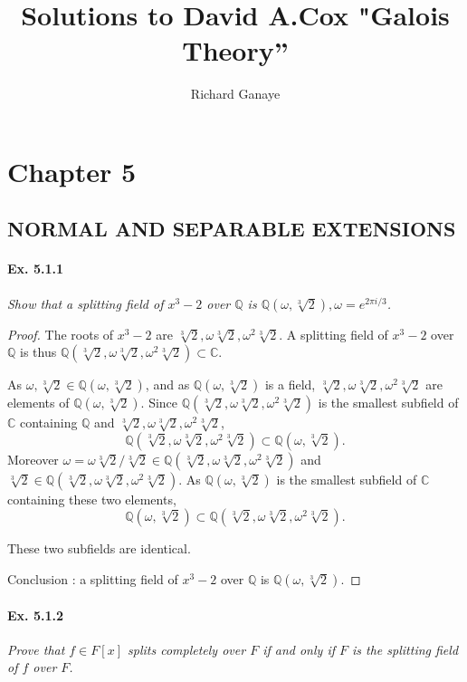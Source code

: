 \documentclass[11pt,a4paper]{article}
\title{Solutions to David A.Cox  "Galois Theory''}
\author{Richard Ganaye}
\newcommand{\Q}{\mathbb{Q}}
\newcommand{\C}{\mathbb{C}}
\begin{document}
\section{Chapter 5}

\subsection{NORMAL AND SEPARABLE EXTENSIONS}

\paragraph{Ex. 5.1.1}

{\it Show that a splitting field of $x^3-2$ over $\Q$ is $\Q(\omega,\sqrt[3]{2}), \omega = e^{2\pi i/3}$.
}

\begin{proof}
The roots of $x^3-2$ are $\sqrt[3]{2},\omega \sqrt[3]{2},\omega^2 \sqrt[3]{2}$. A splitting field of $x^3-2$ over $\Q$ is thus $\Q(\sqrt[3]{2},\omega \sqrt[3]{2},\omega^2 \sqrt[3]{2}) \subset \C$.

As $\omega,\sqrt[3]{2} \in \Q(\omega,\sqrt[3]{2})$, and as $\Q(\omega,\sqrt[3]{2})$ is a field, $\sqrt[3]{2},\omega \sqrt[3]{2},\omega^2 \sqrt[3]{2}$ are elements of $\Q(\omega,\sqrt[3]{2})$. Since $\Q(\sqrt[3]{2},\omega \sqrt[3]{2},\omega^2 \sqrt[3]{2}) $ is the smallest subfield of $\C$ containing $\Q$ and $\sqrt[3]{2},\omega \sqrt[3]{2},\omega^2 \sqrt[3]{2}$,
$$\Q(\sqrt[3]{2},\omega \sqrt[3]{2},\omega^2 \sqrt[3]{2}) \subset \Q(\omega,\sqrt[3]{2}).$$
Moreover  $ \omega = \omega\sqrt[3]{2} / \sqrt[3]{2} \in \Q(\sqrt[3]{2},\omega \sqrt[3]{2},\omega^2 \sqrt[3]{2})$ and $\sqrt[3]{2} \in \Q(\sqrt[3]{2},\omega \sqrt[3]{2},\omega^2 \sqrt[3]{2})$. As $\Q(\omega,\sqrt[3]{2})$ is the smallest subfield of $\C$ containing these two elements, 
 $$\Q(\omega,\sqrt[3]{2}) \subset \Q(\sqrt[3]{2},\omega \sqrt[3]{2},\omega^2 \sqrt[3]{2}).$$
 
These two subfields are identical.
 
 Conclusion : a splitting field of $x^3-2$ over $\Q$ is $\Q(\omega,\sqrt[3]{2})$.
\end{proof}

\paragraph{Ex. 5.1.2}

{\it Prove that $f\in F[x]$ splits completely over $F$ if and only if $F$ is the splitting field of $f$ over $F$.
}
\end{document}

